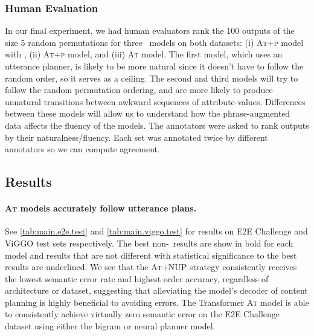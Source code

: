 \subsubsection{Human Evaluation} In our final experiment, we had human
evaluators rank the 100 outputs of the size 5 random permutations for three
\BART~models on both datasets: (i) \textsc{At+p} model with \NUP,  (ii)
\textsc{At+p} model, and (iii) \textsc{At} model.  The first model, which uses
an utterance planner, is likely to be more natural since it doesn't have to
follow the random order, so it serves as a ceiling.  The second and third
models will try to follow the random permutation ordering, and are more likely
to produce unnatural transitions between awkward sequences of attribute-values.
Differences between these models will allow us to understand how the
phrase-augmented data affects the fluency of the models.  The annotators were
asked to rank outputs by their naturalness/fluency.  Each set was annotated
twice by different annotators so we can compute agreement. 

\newcommand{\lsname}[1]{\textsc{#1}}
\newcommand{\lsshort}[1]{\textsc{#1}}
\newcommand{\size}[1]{|#1|}
\newcommand{\lin}{\pi}
\newcommand{\valstr}[1]{\textit{#1}}
\newcommand{\uttstr}[1]{\textit{#1}}
\newcommand{\alignshort}{AT}
\newcommand{\enc}{Enc}
\newcommand{\rep}{h}
\newcommand{\attrval}[2]{#1=#2}
\newcommand{\phraseAug}{+p}
\newcommand{\DA}[1]{\textsc{#1}}

\subsection{Results}

\paragraph{\lsshort{At} models accurately follow utterance plans.} See
\autoref{tab:main.e2e.test} and \autoref{tab:main.viggo.test} for results on
E2E Challenge and ViGGO test sets respectively.  The best non-\Oracle~results
are show in bold for each model and results that are not different with
statistical significance to the best results are underlined.  We see that the
\lsshort{At+NUP} strategy consistently receives the lowest semantic error rate
and highest order accuracy, regardless of architecture or dataset, suggesting
that alleviating the model's decoder of content planning is highly beneficial
to avoiding errors. The Transformer \lsshort{At} model is able to consistently
achieve virtually zero semantic error on the E2E Challenge dataset using either
the bigram or neural planner model.

